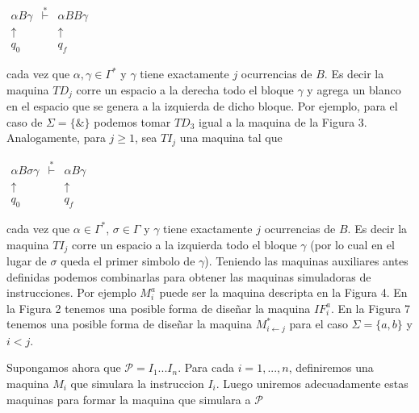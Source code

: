 \(\displaystyle \begin{array}{ccc} \alpha B\gamma & \overset{\ast }{\vdash } & \alpha BB\gamma \\ \uparrow & & \uparrow \ \ \\ q_{0} & & q_{f}\ \ \end{array} \)

cada vez que \(\alpha ,\gamma \in \Gamma ^{\ast }\) y \(\gamma \) tiene exactamente \(j\) ocurrencias de \(B\). Es decir la maquina \(TD_{j}\) corre un espacio a la derecha todo el bloque \(\gamma \) y agrega un blanco en el espacio que se genera a la izquierda de dicho bloque. Por ejemplo, para el caso de \(\Sigma =\{\& \}\) podemos tomar \(TD_{3}\) igual a la maquina de la Figura 3.
Analogamente, para \(j\geq 1\), sea \(TI_{j}\) una maquina tal que

\(\displaystyle \begin{array}{ccc} \alpha B\sigma \gamma & \overset{\ast }{\vdash } & \alpha B\gamma \\ \uparrow \ & & \uparrow \\ q_{0}\ \ & & q_{f} \end{array} \)

cada vez que \(\alpha \in \Gamma ^{\ast }\), \(\sigma \in \Gamma \) y \(\gamma \) tiene exactamente \(j\) ocurrencias de \(B\). Es decir la maquina \(TI_{j}\) corre un espacio a la izquierda todo el bloque \(\gamma \) (por lo cual en el lugar de \(\sigma \) queda el primer simbolo de \(\gamma \)).
Teniendo las maquinas auxiliares antes definidas podemos combinarlas para obtener las maquinas simuladoras de instrucciones. Por ejemplo \(M_{i}^{a}\) puede ser la maquina descripta en la Figura 4. En la Figura 2 tenemos una posible forma de dise\~{n}ar la maquina \(IF_{i}^{a}\). En la Figura 7 tenemos una posible forma de dise\~{n}ar la maquina \(M_{i\leftarrow j}^{\ast }\) para el caso \(\Sigma =\{a,b\}\) y \(i< j\).

Supongamos ahora que \(\mathcal{P}=I_{1}...I_{n}\). Para cada \(i=1,...,n\), definiremos una maquina \(M_{i}\) que simulara la instruccion \(I_{i}\). Luego uniremos adecuadamente estas maquinas para formar la maquina que simulara a \( \mathcal{P}\)

